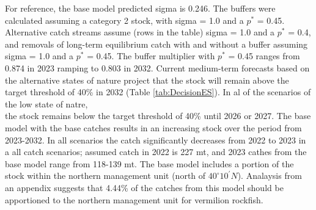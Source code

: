 \documentclass[11pt,
  english,
  a4paper,
]{article}
\begin{document}
For reference, the base model predicted sigma is 0.246. The buffers were calculated assuming a category 2 stock, with sigma = 1.0 and a {\(p^*\)\leavevmode\tagmcend\tagstructend} = 0.45. Alternative catch streams assume (rows in the table) sigma = 1.0 and a {\(p^*\)\leavevmode\tagmcend\tagstructend} = 0.4, and removals of long-term equilibrium catch with and without a buffer assuming sigma = 1.0 and a {\(p^*\)\leavevmode\tagmcend\tagstructend} = 0.45. The buffer multiplier with {\(p^*\)\leavevmode\tagmcend\tagstructend} = 0.45 ranges from 0.874 in 2023 ramping to 0.803 in 2032. Current medium-term forecasts based on the alternative states of nature project that the stock will remain above the target threshold of 40\% in 2032 (Table \ref{tab:DecisionES}). In al of the scenarios of the low state of natre,\\
the stock remains below the target threshold of 40\% until 2026 or 2027. The base model with the base catches results in an increasing stock over the period from 2023-2032. In all scenarios the catch significantly decreases from 2022 to 2023 in a all catch scenarios; assumed catch in 2022 is 227 mt, and 2023 cathes from the base model range from 118-139 mt. The base model includes a portion of the stock within the northern management unit (north of $40^\circ 10^\prime N$). Analaysis from an appendix suggests that 4.44\% of the catches from this model should be apportioned to the northern management unit for vermilion rockfish.
\end{document}

